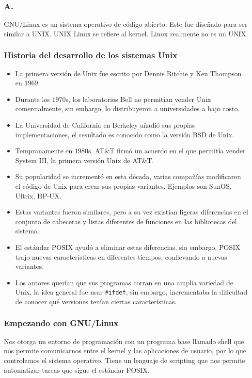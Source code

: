 




\begin{frame}
	\frametitle{A.}
	GNU/Linux es un sistema operativo de código abierto. Este fue diseñado para ser similar a UNIX.
	UNIX
	Linux se refiere al kernel.
	Linux realmente no es un UNIX.
\end{frame}

\begin{frame}

	\frametitle{Historia del desarrollo de los sistemas Unix}

	\begin{itemize}
		\item
		      La primera versión de Unix fue escrito por Dennis Ritchie y Ken Thompson en $1969$.
		\item
		      Durante los $1970$s, los laboratorios Bell no permitían vender Unix comercialmente, sin embargo, lo distribuyeron a universidades a bajo costo.
		\item
		      La Universidad de California en Berkeley añadió sus propias implementaciones, el resultado es conocido como la versión BSD de Unix.
		\item
		      Tempranamente en $1980$s, AT\&T firmó un acuerdo en el que permitía vender System III, la primera versión Unix de AT\&T.
		\item
		      Su popularidad se incrementó en esta década, varias compañías modificaron el código de Unix para crear sus propias variantes. Ejemplos son SunOS, Ultrix, HP-UX.
		\item
		      Estas variantes fueron similares, pero a su vez existían ligeras diferencias en el conjunto de cabeceras y listas diferentes de funciones en las bibliotecas del sistema.
		\item
		      El estándar POSIX ayudó a eliminar estas diferencias, sin embargo, POSIX trajo nuevas características en diferentes tiempos, conllevando a nuevas variantes.
		\item Los autores querían que sus programas corran en una amplia variedad de Unix, la idea general fue usar \texttt{\#ifdef}, sin embargo, incrementaba la dificultad de conocer qué versiones tenían ciertas características.
	\end{itemize}
\end{frame}

\begin{frame}
	\frametitle{Empezando con GNU/Linux}
	Nos otorga un entorno de programación con un programa base llamado shell que nos permite comunicarnos entre el kernel y las aplicaciones de usuario, por lo que controlamos el sistema operativo.
	Tiene un lenguaje de scripting que nos permite automatizar tareas que sigue el estándar POSIX.
\end{frame}

